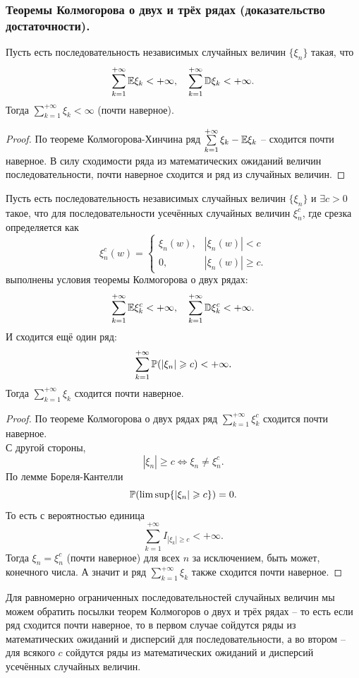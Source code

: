 \subsubsection{Теоремы Колмогорова о двух и трёх рядах (доказательство достаточности).}
\begin{theorem}
    Пусть есть последовательность независимых случайных величин $\{\xi_n\}$ такая, что
    \[
        \sum\limits_{k = 1}^{+\infty} \Ex \xi_k < +\infty, \quad \sum\limits_{k = 1}^{+\infty} \D \xi_k < +\infty.
    \]
    Тогда $\sum\limits_{k = 1}^{+\infty} \xi_k < \infty$ (почти наверное).
\end{theorem}
\begin{proof}
    По теореме Колмогорова-Хинчина ряд $\sum\limits_{k = 1}^{+\infty} \xi_k - \Ex \xi_k$ -- сходится почти наверное.
    В силу сходимости ряда из математических ожиданий величин последовательности, почти наверное сходится и ряд из случайных величин.
\end{proof}
\begin{theorem}
    Пусть есть последовательность независимых случайных величин $\{\xi_n\}$ и $\exists c > 0$ такое, что для последовательности усечённых случайных величин $\xi^c_n$, где срезка определяется как
    \[
        \xi_n^c(w) = \begin{cases}
                      \xi_n(w), & |\xi_n(w)| < c \\
                         0, & |\xi_n(w)| \geq c.
        \end{cases}
    \]
    выполнены условия теоремы Колмогорова о двух рядах:
    \[
        \sum\limits_{k = 1}^{+\infty} \Ex \xi_k^c < +\infty, \quad \sum\limits_{k = 1}^{+\infty} \D \xi_k^c < +\infty.
    \]
    И сходится ещё один ряд:
    \[
        \sum\limits_{k = 1}^{+\infty} \P(|\xi_n| \geq c) < +\infty.
    \]
    Тогда $\sum\limits_{k = 1}^{+\infty} \xi_k$ сходится почти наверное.
\end{theorem}
\begin{proof}
    По теореме Колмогорова о двух рядах ряд $\sum\limits_{k = 1}^{+\infty} \xi_k^c$ сходится почти наверное. \\
    С другой стороны,
    \[
        |\xi_n| \geq c \Longleftrightarrow \xi_n \neq \xi_n^c.
    \]
    По лемме Бореля-Кантелли
    \[
        \P(\limsup \{|\xi_n| \geq c\}) = 0.
    \]
    То есть с вероятностью единица
    \[
        \sum\limits_{k = 1}^{+\infty} I_{|\xi_k| \geq c} < +\infty.
    \]
    Тогда $\xi_n = \xi_n^c$ (почти наверное) для всех $n$ за исключением, быть может, конечного числа.
    А значит и ряд $\sum\limits_{k = 1}^{+\infty} \xi_k$ также сходится почти наверное.
\end{proof}
\begin{note}
    Для равномерно ограниченных последовательностей случайных величин мы можем обратить посылки теорем Колмогоров о двух и трёх рядах -- то есть если ряд сходится почти наверное, то в первом случае сойдутся ряды из математических ожиданий и дисперсий для последовательности, а во втором -- для всякого $c$ сойдутся ряды из математических ожиданий и дисперсий усечённых случайных величин.
\end{note}
